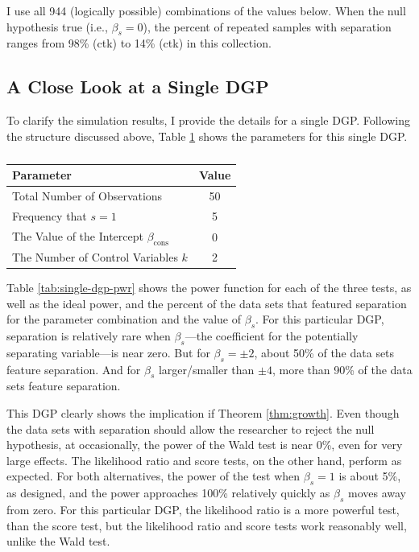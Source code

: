 \documentclass[
]{article}
\begin{document}
I use all 944 (logically possible) combinations of the values below.
When the null hypothesis true (i.e., \(\beta_s = 0\)), the percent of
repeated samples with separation ranges from 98\% (ctk) to 14\% (ctk) in
this collection.

\hypertarget{a-close-look-at-a-single-dgp}{%
\subsection{A Close Look at a Single
DGP}\label{a-close-look-at-a-single-dgp}}

To clarify the simulation results, I provide the details for a single
DGP. Following the structure discussed above, Table
\ref{tab:single-dgp-pars} shows the parameters for this single DGP.

\renewcommand{\captiontext}{}
\renewcommand{\notetext}{}
\begin{table}[!h]
\caption{\label{tab:single-dgp-pars}}
\centering
\fontsize{10}{12}\selectfont
\begin{threeparttable}
\begin{tabular}{lc}
\toprule
Parameter & Value        \\
\midrule
Total Number of Observations & 50 \\
Frequency that $s = 1$    &   5 \\
The Value of the Intercept $\beta_{\text{cons}}$ & 0 \\
The Number of Control Variables $k$ & 2 \\
\bottomrule
\end{tabular}\begin{tablenotes}[para]

\end{tablenotes}
\end{threeparttable}
\end{table}

Table \ref{tab:single-dgp-pwr} shows the power function for each of the
three tests, as well as the ideal power, and the percent of the data
sets that featured separation for the parameter combination and the
value of \(\beta_s\). For this particular DGP, separation is relatively
rare when \(\beta_s\)---the coefficient for the potentially separating
variable---is near zero. But for \(\beta_s = \pm 2\), about 50\% of the
data sets feature separation. And for \(\beta_s\) larger/smaller than
\(\pm 4\), more than 90\% of the data sets feature separation.

This DGP clearly shows the implication if Theorem \ref{thm:growth}. Even
though the data sets with separation should allow the researcher to
reject the null hypothesis, at occasionally, the power of the Wald test
is near 0\%, even for very large effects. The likelihood ratio and score
tests, on the other hand, perform as expected. For both alternatives,
the power of the test when \(\beta_s = 1\) is about 5\%, as designed,
and the power approaches 100\% relatively quickly as \(\beta_s\) moves
away from zero. For this particular DGP, the likelihood ratio is a more
powerful test, than the score test, but the likelihood ratio and score
tests work reasonably well, unlike the Wald test.
\end{document}
